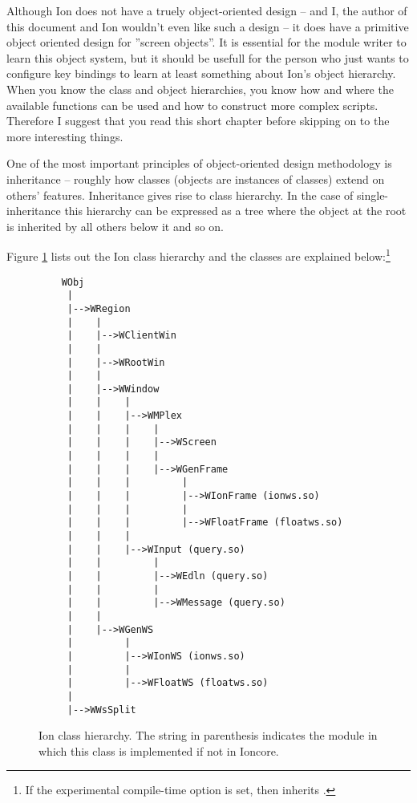 
\label{chap:prelim}

Although Ion does not have a truely object-oriented design -- and I,
the author of this document and Ion wouldn't even like such a design -- 
it does have a primitive object oriented design for ''screen objects''.
It is essential for the module writer to learn this object system,
but it should be usefull for the person who just wants to configure
key bindings to learn at least something about Ion's object hierarchy.
When you know the class and object hierarchies, you know how and where
the available functions can be used and how to construct more complex
scripts. Therefore I suggest that you read this short chapter before
skipping on to the more interesting things.



One of the most important principles of object-oriented design methodology
is inheritance -- roughly how classes (objects are instances of classes)
extend on others' features. Inheritance gives rise to class hierarchy.
In the case of single-inheritance this hierarchy can be expressed as a
tree where the object at the root is inherited by all others below it
and so on.

Figure \ref{fig:classhierarchy} lists out the Ion class hierarchy and
the classes are explained below:\footnote{If the experimental 
  compile-time option  is set, 
  then inherits .}

\begin{figure}
\begin{verbatim}
    WObj
     |
     |-->WRegion
     |    |
     |    |-->WClientWin
     |    |
     |    |-->WRootWin
     |    |
     |    |-->WWindow
     |    |    |
     |    |    |-->WMPlex
     |    |    |    |
     |    |    |    |-->WScreen
     |    |    |    |
     |    |    |    |-->WGenFrame
     |    |    |         |
     |    |    |         |-->WIonFrame (ionws.so)
     |    |    |         |
     |    |    |         |-->WFloatFrame (floatws.so)
     |    |    |
     |    |    |-->WInput (query.so)
     |    |         |
     |    |         |-->WEdln (query.so)
     |    |         |
     |    |         |-->WMessage (query.so)
     |    |
     |    |-->WGenWS
     |         |
     |         |-->WIonWS (ionws.so)
     |         |
     |         |-->WFloatWS (floatws.so)
     |
     |-->WWsSplit
\end{verbatim}
\caption{Ion class hierarchy. The string in parenthesis indicates
  the module in which this class is implemented if not in Ioncore.}
\label{fig:classhierarchy}
\end{figure}

